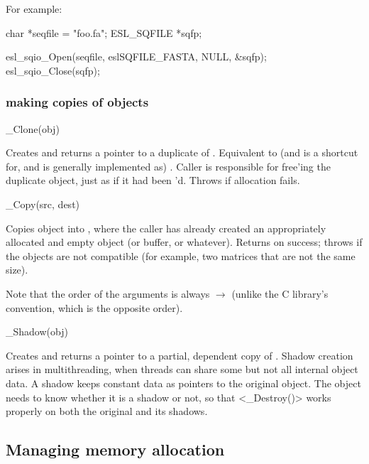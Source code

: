 For example:
\begin{cchunk}
    char        *seqfile = "foo.fa";
    ESL_SQFILE  *sqfp;

    esl_sqio_Open(seqfile, eslSQFILE_FASTA, NULL, &sqfp);
    esl_sqio_Close(sqfp);
\end{cchunk}


  \subsubsection{making copies of objects}

\begin{sreapi}

\hypertarget{ifc:Clone}
{\item[\_Clone(obj)]}

Creates and returns a pointer to a duplicate of .
Equivalent to (and is a shortcut for, and is generally implemented as)
. Caller is responsible
for free'ing the duplicate object, just as if it had been
'd. Throws  if allocation fails.


\hypertarget{ifc:Copy}
{\item[\_Copy(src, dest)]}

Copies  object into , where the caller has
already created an appropriately allocated and empty 
object (or buffer, or whatever). Returns  on success;
throws  if the objects are not compatible (for
example, two matrices that are not the same size).

Note that the order of the arguments is always 
$\rightarrow$  (unlike the C library's 
convention, which is the opposite order).


\hypertarget{ifc:Shadow}
{\item[\_Shadow(obj)]}

Creates and returns a pointer to a partial, dependent copy of
. Shadow creation arises in multithreading, when threads
can share some but not all internal object data. A shadow keeps
constant data as pointers to the original object.  The object needs to
know whether it is a shadow or not, so that <\_Destroy()> works
properly on both the original and its shadows.

\end{sreapi}

  \subsection{Managing memory allocation}

